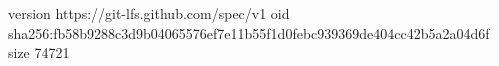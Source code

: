 version https://git-lfs.github.com/spec/v1
oid sha256:fb58b9288c3d9b04065576ef7e11b55f1d0febc939369de404cc42b5a2a04d6f
size 74721
